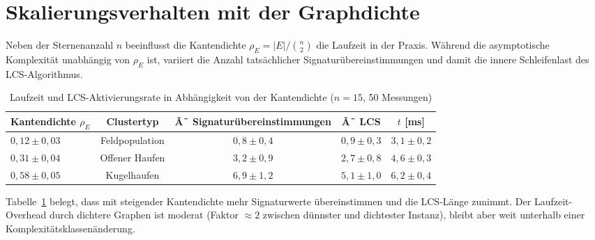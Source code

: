 ﻿\documentclass[a4paper,12pt]{report}
\theoremstyle{definition}
\begin{document}
\section{Skalierungsverhalten mit der Graphdichte}
\label{sec:empirie_dichte}

Neben der Sternenanzahl $n$ beeinflusst die Kantendichte $\rho_E = |E| / \binom{n}{2}$ die Laufzeit in der Praxis. Während die asymptotische Komplexität unabhängig von $\rho_E$ ist, variiert die Anzahl tatsächlicher Signaturübereinstimmungen und damit die innere Schleifenlast des LCS-Algorithmus.

\begin{table}[H]
\centering
\caption{Laufzeit und LCS-Aktivierungsrate in Abhängigkeit von der Kantendichte ($n = 15$, 50 Messungen)}
\label{tab:dichte}
\begin{tabular}{lcccc}
\toprule
Kantendichte $\rho_E$ & Clustertyp & Ã˜ Signaturübereinstimmungen & Ã˜ LCS & $t$ [ms] \\
\midrule
$0{,}12 \pm 0{,}03$ & Feldpopulation  & $0{,}8 \pm 0{,}4$  & $0{,}9 \pm 0{,}3$ & $3{,}1 \pm 0{,}2$ \\
$0{,}31 \pm 0{,}04$ & Offener Haufen  & $3{,}2 \pm 0{,}9$  & $2{,}7 \pm 0{,}8$ & $4{,}6 \pm 0{,}3$ \\
$0{,}58 \pm 0{,}05$ & Kugelhaufen     & $6{,}9 \pm 1{,}2$  & $5{,}1 \pm 1{,}0$ & $6{,}2 \pm 0{,}4$ \\
\bottomrule
\end{tabular}
\end{table}

Tabelle~\ref{tab:dichte} belegt, dass mit steigender Kantendichte mehr Signaturwerte übereinstimmen und die LCS-Länge zunimmt. Der Laufzeit-Overhead durch dichtere Graphen ist moderat (Faktor $\approx 2$ zwischen dünnster und dichtester Instanz), bleibt aber weit unterhalb einer Komplexitätsklassenänderung.

\end{document}
